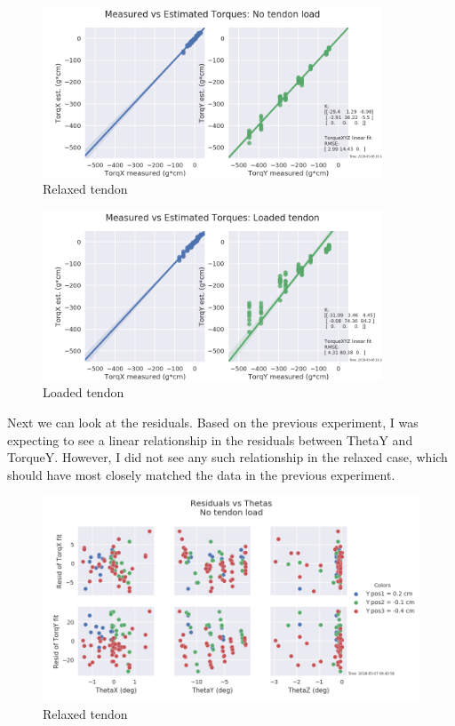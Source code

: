 \documentclass[preprint,12pt,3p]{elsarticle}
\begin{document}
\begin{figure}[H]
\centering
\includegraphics[width=0.9\textwidth]{images/stiff/torqsanity.png}
\caption{Relaxed tendon}
\end{figure}

\begin{figure}[H]
\centering
\includegraphics[width=0.9\textwidth]{images/stiff/torqsanity_loaded.png}
\caption{Loaded tendon}
\end{figure}



Next we can look at the residuals. Based on the previous experiment, I was expecting to see a linear
relationship in the residuals between ThetaY and TorqueY. However, I did not see any such
relationship in the relaxed case, which should have most closely matched the data in the previous
experiment. 

\begin{figure}[H]
\centering
\includegraphics[width=.9\textwidth]{images/stiff/GOODResid_vs_Theta.png}
\caption{Relaxed tendon}
\end{figure}
\end{document}
